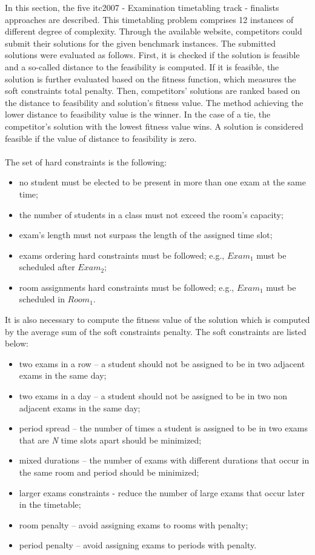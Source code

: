 In this section, the five \gls{itc2007} - Examination timetabling track - finalists approaches are described. This timetabling problem comprises 12 instances of different degree of complexity. Through the available website, competitors could submit their solutions for the given benchmark instances. The submitted solutions were evaluated as follows. First, it is checked if the solution is feasible and a so-called distance to the feasibility is computed. If it is feasible, the solution is further evaluated based on the fitness function, which measures the soft constraints total penalty. Then, competitors' solutions are ranked based on the distance to feasibility and solution's fitness value. The method achieving the lower distance to feasibility value is the winner. In the case of a tie, the competitor's solution with the lowest fitness value wins. A solution is considered feasible if the value of distance to feasibility is zero. \\
\\
The set of hard constraints is the following:
\begin{itemize}
	\item no student must be elected to be present in more than one exam at the same time;
	\item the number of students in a class must not exceed the room's capacity;
	\item exam's length must not surpass the length of the assigned time slot;
	\item exams ordering hard constraints must be followed; e.g., $Exam_1$ must be scheduled after $Exam_2$;
	\item room assignments hard constraints must be followed; e.g., 	$Exam_1$ must be scheduled in $Room_1$.
\end{itemize}
It is also necessary to compute the fitness value of the solution which is computed by the average sum of the soft constraints penalty. The soft constraints are listed below:
\begin{itemize}
	\item two exams in a row -- a student should not be assigned to be in two adjacent exams in the same day;
	\item two exams in a day -- a student should not be assigned to be in two non adjacent exams in the same day;
	\item period spread -- the number of times a student is assigned to be in two exams that are \textit{N} time slots apart should be minimized;
	\item mixed durations -- the number of exams with different durations that occur in the same room and period should be minimized;
	\item larger exams constraints - reduce the number of large exams that occur later in the timetable;
	\item room penalty -- avoid assigning exams to rooms with penalty;
	\item period penalty -- avoid assigning exams to periods with penalty.
\end{itemize}
